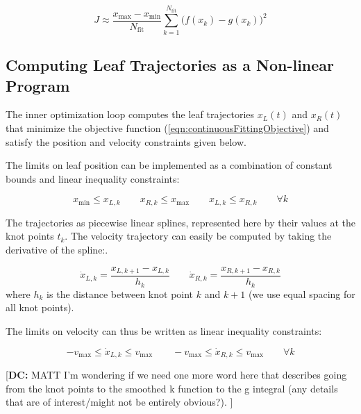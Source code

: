 \documentclass[12pt]{article}
\newcommand{\DCcomment}[1]{{\color{magenta}\par {[{\bf DC: } { #1}} ] \\    }}
\begin{document}
\begin{equation}
  J \approx \frac{x_\text{max} - x_\text{min}}{N_\text{fit}}
  \sum_{k = 1}^{N_\text{fit}} \! \bigg( f(x_k) - g(x_k) \bigg)^2
  \label{eqn:discreteFittingObjective}
\end{equation}

\subsection{Computing Leaf Trajectories as a Non-linear Program}
\label{sec:LeafTrajectoryAsNLP}

The inner optimization loop computes the leaf trajectories $x_L(t)$ and $x_R(t)$
that minimize the objective function (\ref{eqn:continuousFittingObjective})
and satisfy the position and velocity constraints given below.

The limits on leaf position can be implemented as a combination of
constant bounds and linear inequality constraints:

\begin{equation}
  x_\text{min} \leq x_{L, k}
  \quad \quad
  x_{R, k} \leq x_\text{max}
  \quad \quad
  x_{L, k} \leq x_{R, k}
  \quad \quad
  \forall k
  \label{eqn:PositionLimits}
\end{equation}

The trajectories as piecewise linear splines, represented here by their values at the knot points $t_k$.
The velocity trajectory can easily be computed by taking the derivative of the spline:.

\begin{equation}
  \dot{x}_{L, k} = \frac{x_{L, k+1} - x_{L, k}}{h_k}
  \quad \quad
  \dot{x}_{R, k} = \frac{x_{R, k+1} - x_{R, k}}{h_k}
\end{equation}
\noindent where $h_k$ is the distance between knot point $k$ and $k+1$ (we use equal spacing for all knot points).

The limits on velocity can thus be written as linear inequality constraints:

\begin{equation}
  -v_\text{max} \leq \dot{x}_{L, k} \leq v_\text{max}
  \quad \quad
  -v_\text{max} \leq \dot{x}_{R, k} \leq v_\text{max}
  \quad \quad \forall k
  \label{eqn:VelocityLimits}
\end{equation}

\DCcomment{MATT I'm wondering if we need one more word here that describes going from
the knot points to the smoothed k function to the g integral (any details that are of interest/might
not be entirely obvious?).} 
\end{document}

